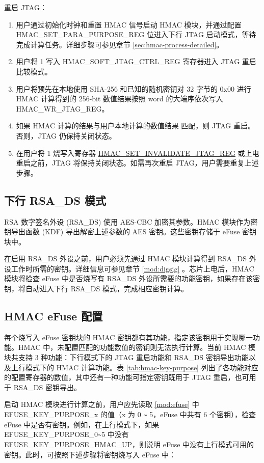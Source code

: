 \documentclass[main\_\_CN.tex]{subfiles}
\begin{document}
重启 JTAG：
\begin{enumerate}
    \item 用户通过初始化时钟和重置 HMAC 信号启动 HMAC 模块，并通过配置 HMAC\_SET\_PARA\_PURPOSE\_REG 位进入下行 JTAG 启动模式，等待完成计算任务。详细步骤可参见章节 \ref{sec:hmac-process-detailed}。
    \item 用户将 1 写入 HMAC\_SOFT\_JTAG\_CTRL\_REG 寄存器进入 JTAG 重启比较模式。
    \item 用户将预先在本地使用 SHA-256 和已知的随机密钥对 32 字节的 0x00 进行 HMAC 计算得到的 256-bit 数值结果按照 word 的大端序依次写入 HMAC\_WR\_JTAG\_REG。
    \item 如果 HMAC 计算的结果与用户本地计算的数值结果 匹配，则 JTAG 重启。否则，JTAG 仍保持关闭状态。
    \item 在用户将 1 烧写入寄存器 \hyperref[regdesc:HMACSETINVALIDATEJTAGREG]{HMAC\_SET\_INVALIDATE\_JTAG\_REG} 或上电重启之前，JTAG 将保持关闭状态。如需再次重启 JTAG，用户需要重复上述步骤。
    \end{enumerate}


\subsection{下行 RSA\_DS 模式}

RSA 数字签名外设 (RSA\_DS) 使用 AES-CBC 加密其参数。HMAC 模块作为密钥导出函数 (KDF) 导出解密上述参数的 AES 密钥。这些密钥存储于 eFuse 密钥块中。

在启用 RSA\_DS 外设之前，用户必须先通过 HMAC 模块计算得到 RSA\_DS 外设工作时所需的密钥。详细信息可参见章节 \ref{mod:digsig} \textit{}。芯片上电后，HMAC 模块将检查 eFuse 中是否烧写有 RSA\_DS 外设所需要的功能密钥，如果存在该密钥，将自动进入下行 RSA\_DS 模式，完成相应密钥计算。

\subsection{HMAC eFuse 配置}
\label{sec:hmac-config-function}

每个烧写入 eFuse 密钥块的 HMAC 密钥都有其功能，指定该密钥用于实现哪一功能。HMAC 中，未配置匹配的功能数值的密钥则无法执行计算。当前 HMAC 模块共支持 3 种功能：下行模式下的 JTAG 重启功能和 RSA\_DS 密钥导出功能以及上行模式下的 HMAC 计算功能。表 \ref{tab:hmac-key-purpose} 列出了各功能对应的配置寄存器的数值，其中还有一种功能可指定密钥既用于 JTAG 重启，也可用于 RSA\_DS 密钥导出。

启动 HMAC 模块进行计算之前，用户应先读取 \ref{mod:efuse} \textit{} 中 EFUSE\_KEY\_PURPOSE\_x 的值（x 为 0 \verb+~+ 5，eFuse 中共有 6 个密钥），检查 eFuse 中是否有密钥。例如，在上行模式下，如果 EFUSE\_KEY\_PURPOSE\_0\verb+~+5 中没有 EFUSE\_KEY\_PURPOSE\_HMAC\_UP，则说明 eFuse 中没有上行模式可用的密钥。此时，可按照下述步骤将密钥烧写入 eFuse 中：
\end{document}

